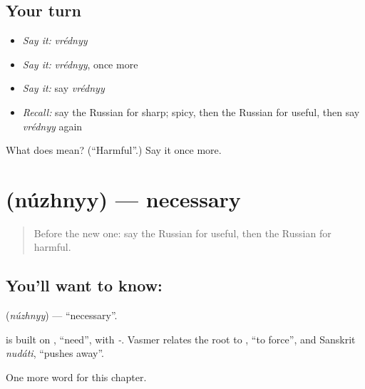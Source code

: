 \subsection*{Your turn}
\begin{itemize}
\raggedright
  \item \emph{Say it:} \emph{vrédnyy}
  \item \emph{Say it:} \emph{vrédnyy}, once more
  \item \emph{Say it:} say \emph{vrédnyy}
  \item \emph{Recall:} say the Russian for sharp; spicy, then the Russian for useful, then say \emph{vrédnyy} again
\end{itemize}

\begin{tcolorbox}[breakable,colback=teal!4,colframe=teal!35!black,title={Before you move on}]
What does  mean? (\textquotedblleft{}Harmful\textquotedblright{}.) Say it once more.
\end{tcolorbox}
\section[\texorpdfstring{\ru{нужный} (núzhnyy)}{нужный (núzhnyy)}]{ (núzhnyy) — necessary}

\label{lesson:RU-C188-nuzhnyy}



\begin{quote}
Before the new one: say the Russian for useful, then the Russian for harmful.
\end{quote}

\subsection*{You'll want to know: }
\textbf{} (\emph{núzhnyy}) — \textquotedblleft{}necessary\textquotedblright{}.

\begin{cousinweb}
\textbf{} is built on \emph{}, \textquotedblleft{}need\textquotedblright{}, with \emph{-}. Vasmer relates the root to \emph{}, \textquotedblleft{}to force\textquotedblright{}, and Sanskrit \emph{nudáti}, \textquotedblleft{}pushes away\textquotedblright{}.
\end{cousinweb}

\begin{grammarlens}[title={What you've built}]
One more word for this chapter.
\end{grammarlens}

